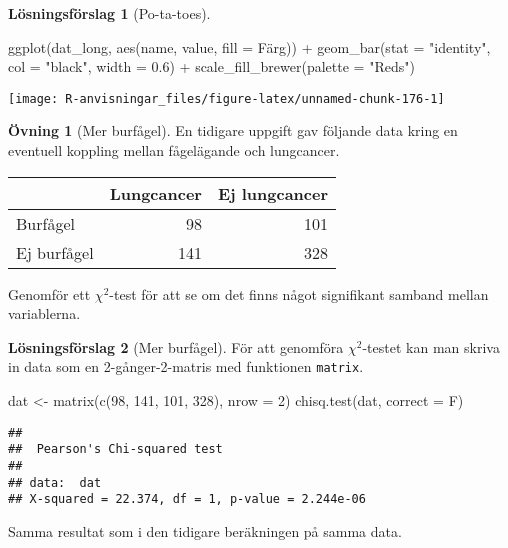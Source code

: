 \documentclass[
]{book}
\newenvironment{Shaded}{\begin{snugshade}}{\end{snugshade}}
\newcommand{\AttributeTok}[1]{\textcolor[rgb]{0.77,0.63,0.00}{#1}}
\newcommand{\DecValTok}[1]{\textcolor[rgb]{0.00,0.00,0.81}{#1}}
\newcommand{\FloatTok}[1]{\textcolor[rgb]{0.00,0.00,0.81}{#1}}
\newcommand{\FunctionTok}[1]{\textcolor[rgb]{0.00,0.00,0.00}{#1}}
\newcommand{\NormalTok}[1]{#1}
\newcommand{\OtherTok}[1]{\textcolor[rgb]{0.56,0.35,0.01}{#1}}
\newcommand{\SpecialCharTok}[1]{\textcolor[rgb]{0.00,0.00,0.00}{#1}}
\newcommand{\StringTok}[1]{\textcolor[rgb]{0.31,0.60,0.02}{#1}}
\theoremstyle{definition}
\theoremstyle{definition}
\theoremstyle{definition}
\newtheorem{exercise}{Övning}[chapter]
\theoremstyle{definition}
\newtheorem{hypothesis}{Lösningsförslag}[chapter]
\theoremstyle{remark}
\begin{document}
\begin{hypothesis}[Po-ta-toes]
\begin{Shaded}
\begin{Highlighting}[]
\FunctionTok{ggplot}\NormalTok{(dat\_long, }\FunctionTok{aes}\NormalTok{(name, value, }\AttributeTok{fill =}\NormalTok{ Färg)) }\SpecialCharTok{+}
  \FunctionTok{geom\_bar}\NormalTok{(}\AttributeTok{stat =} \StringTok{"identity"}\NormalTok{, }\AttributeTok{col =} \StringTok{"black"}\NormalTok{, }\AttributeTok{width =} \FloatTok{0.6}\NormalTok{) }\SpecialCharTok{+}
  \FunctionTok{scale\_fill\_brewer}\NormalTok{(}\AttributeTok{palette =} \StringTok{"Reds"}\NormalTok{)}
\end{Highlighting}
\end{Shaded}

\begin{center}\texttt{[image: R-anvisningar\_files/figure-latex/unnamed-chunk-176-1]} \end{center}

\end{hypothesis}

\begin{exercise}[Mer burfågel]
En tidigare uppgift gav följande data kring en eventuell koppling mellan fågelägande och lungcancer.

\begin{table}
\centering
\begin{tabular}[t]{lrr}
\toprule
  & Lungcancer & Ej lungcancer\\
\midrule
Burfågel & 98 & 101\\
Ej burfågel & 141 & 328\\
\bottomrule
\end{tabular}
\end{table}

Genomför ett \(\chi^2\)-test för att se om det finns något signifikant samband mellan variablerna.
\end{exercise}

\begin{hypothesis}[Mer burfågel]
För att genomföra \(\chi^2\)-testet kan man skriva in data som en 2-gånger-2-matris med funktionen \texttt{matrix}.

\begin{Shaded}
\begin{Highlighting}[]
\NormalTok{dat }\OtherTok{\textless{}{-}} \FunctionTok{matrix}\NormalTok{(}\FunctionTok{c}\NormalTok{(}\DecValTok{98}\NormalTok{, }\DecValTok{141}\NormalTok{, }\DecValTok{101}\NormalTok{, }\DecValTok{328}\NormalTok{), }\AttributeTok{nrow =} \DecValTok{2}\NormalTok{)}
\FunctionTok{chisq.test}\NormalTok{(dat, }\AttributeTok{correct =}\NormalTok{ F)}
\end{Highlighting}
\end{Shaded}

\begin{verbatim}
## 
##  Pearson's Chi-squared test
## 
## data:  dat
## X-squared = 22.374, df = 1, p-value = 2.244e-06
\end{verbatim}

Samma resultat som i den tidigare beräkningen på samma data.
\end{hypothesis}
\end{document}
